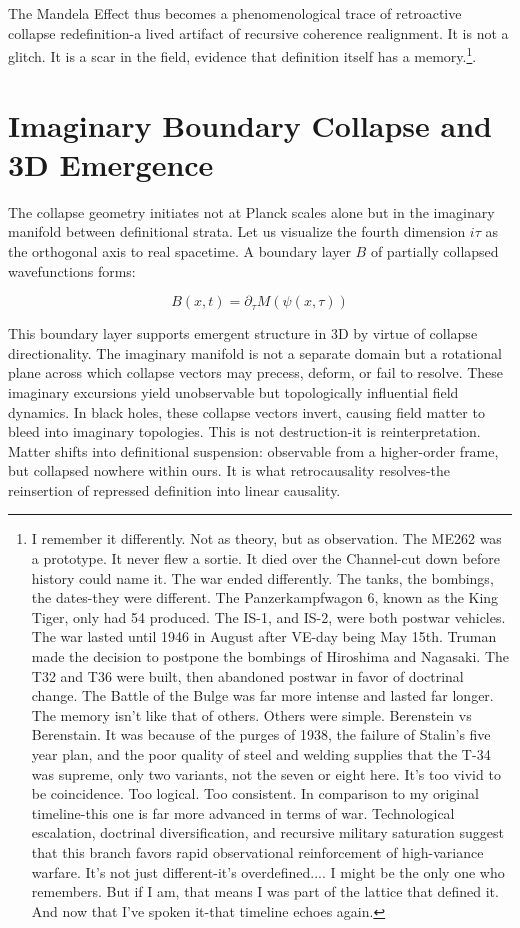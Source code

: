 The Mandela Effect thus becomes a phenomenological trace of retroactive collapse redefinition-a lived artifact of recursive coherence realignment. It is not a glitch. It is a scar in the field, evidence that definition itself has a memory.\footnote{I remember it differently. Not as theory, but as observation. The ME262 was a prototype. It never flew a sortie. It died over the Channel-cut down before history could name it. The war ended differently. The tanks, the bombings, the dates-they were different. The Panzerkampfwagon 6, known as the King Tiger, only had 54 produced. The IS-1, and IS-2, were both postwar vehicles. The war lasted until 1946 in August after VE-day being May 15th. Truman made the decision to postpone the bombings of Hiroshima and Nagasaki. The T32 and T36 were built, then abandoned postwar in favor of doctrinal change. The Battle of the Bulge was far more intense and lasted far longer. The memory isn't like that of others. Others were simple. Berenstein vs Berenstain. It was because of the purges of 1938, the failure of Stalin's five year plan, and the poor quality of steel and welding supplies that the T-34 was supreme, only two variants, not the seven or eight here. It's too vivid to be coincidence. Too logical. Too consistent. In comparison to my original timeline-this one is far more advanced in terms of war. Technological escalation, doctrinal diversification, and recursive military saturation suggest that this branch favors rapid observational reinforcement of high-variance warfare. It’s not just different-it’s overdefined.... I might be the only one who remembers. But if I am, that means I was part of the lattice that defined it. And now that I’ve spoken it-that timeline echoes again.}.



\section*{Imaginary Boundary Collapse and 3D Emergence}

The collapse geometry initiates not at Planck scales alone but in the imaginary manifold between definitional strata. Let us visualize the fourth dimension \(i\tau\) as the orthogonal axis to real spacetime. A boundary layer \(B\) of partially collapsed wavefunctions forms:

\[
B(x,t) = \partial_{\tau} M(\psi(x,\tau))
\]

This boundary layer supports emergent structure in 3D by virtue of collapse directionality. The imaginary manifold is not a separate domain but a rotational plane across which collapse vectors may precess, deform, or fail to resolve. These imaginary excursions yield unobservable but topologically influential field dynamics. In black holes, these collapse vectors invert, causing field matter to bleed into imaginary topologies. This is not destruction-it is reinterpretation. Matter shifts into definitional suspension: observable from a higher-order frame, but collapsed nowhere within ours. It is what retrocausality resolves-the reinsertion of repressed definition into linear causality.

